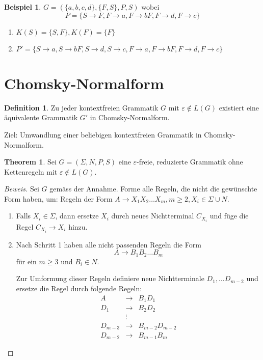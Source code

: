 \documentclass[11pt]{article} %
\theoremstyle{definition}
\newtheorem*{beispiel}{Beispiel}
\newtheorem{definition}{Definition}
\newtheorem{theorem}{Theorem}
\begin{document}
\begin{enumerate}[(1)]
\begin{beispiel}
$G = (\{ a,b,c,d \}, \{F, S\}, P, S)$ wobei
\[
P = \{ S \rightarrow F, F \rightarrow a, F \rightarrow bF, F \rightarrow d, F \rightarrow c \}
\]
\begin{enumerate}
\item $K(S) = \{ S, F \}, K(F) = \{ F \}$
\item $P' = \{ S \rightarrow a, S \rightarrow bF, S \rightarrow d, S \rightarrow c, F \rightarrow a, F \rightarrow bF, F \rightarrow d, F \rightarrow c \}$
\end{enumerate}
\end{beispiel}

\end{enumerate}

\section{Chomsky-Normalform}

\begin{definition}
Zu jeder kontextfreien Grammatik $G$ mit $\varepsilon \notin L(G)$ existiert eine äquivalente Grammatik $G'$ in Chomsky-Normalform.
\end{definition}

Ziel: Umwandlung einer beliebigen kontextfreien Grammatik in Chomsky-Normalform.

\begin{theorem}
Sei $G = (\Sigma, N,P, S)$ eine $\varepsilon$-freie, reduzierte Grammatik ohne Kettenregeln mit $\varepsilon \notin L(G)$.
\end{theorem}
\begin{proof}[Beweis]
Sei $G$ gemäss der Annahme. Forme alle Regeln, die nicht die gewünschte Form haben, um: Regeln der Form $A \rightarrow X_1X_2\dots X_m, m \ge 2, X_i \in \Sigma \cup N$.
\begin{enumerate}
\item Falls $X_i \in \Sigma$, dann ersetze $X_i$ durch neues Nichtterminal $C_{X_i}$ und füge die Regel $C_{X_i} \rightarrow X_i$ hinzu.
\item Nach Schritt 1 haben alle nicht passenden Regeln die Form
\[
A \rightarrow B_1B_2 \dots B_m
\]
für ein $m \ge 3$ und $B_i \in N$.

Zur Umformung dieser Regeln definiere neue Nichtterminale $D_1, \dots D_{m-2}$ und ersetze die Regel durch folgende Regeln:
\begin{eqnarray*}
A &\rightarrow& B_1D_1 \\
D_1 &\rightarrow& B_2D_2 \\
&\vdots& \\
D_{m-3} &\rightarrow& B_{m-2}D_{m-2} \\
D_{m-2} &\rightarrow& B_{m-1}B_m
\end{eqnarray*}
\end{enumerate}
\end{proof}
\end{document}
